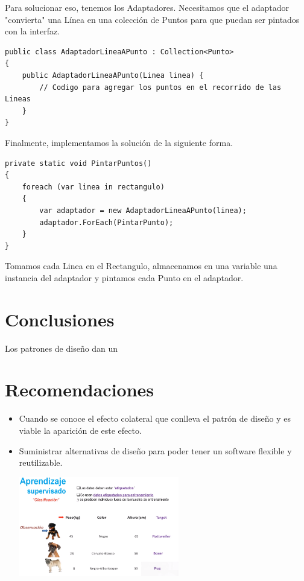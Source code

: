 \documentclass[twoside,twocolumn]{article}
\begin{document}
Para solucionar eso, tenemos los Adaptadores. Necesitamos que el adaptador "convierta" una Línea en una colección de Puntos para que puedan ser pintados con la interfaz.
\lstset{style=sharpc}
\begin{lstlisting}
public class AdaptadorLineaAPunto : Collection<Punto>
{
    public AdaptadorLineaAPunto(Linea linea) {
        // Codigo para agregar los puntos en el recorrido de las Lineas
    }
}
\end{lstlisting}

Finalmente, implementamos la solución de la siguiente forma.
\lstset{style=sharpc}
\begin{lstlisting}
private static void PintarPuntos()
{
    foreach (var linea in rectangulo)
    {
        var adaptador = new AdaptadorLineaAPunto(linea);
        adaptador.ForEach(PintarPunto);
    }  
}
\end{lstlisting}

Tomamos cada Linea en el Rectangulo, almacenamos en una variable una instancia del adaptador y pintamos cada Punto en el adaptador.



\section{Conclusiones}

Los patrones de diseño dan un


\section{Recomendaciones}


\begin{itemize}
\item Cuando se conoce el efecto colateral que conlleva el patrón de diseño y es viable la aparición de este efecto.
\item Suministrar alternativas de diseño para poder tener un software flexible y reutilizable.


\includegraphics[width=7cm]{Imagenes/imagen1}

\end{itemize}
\end{document}
